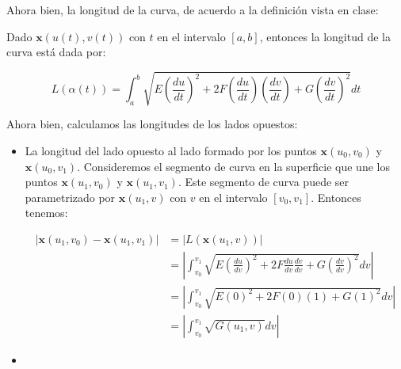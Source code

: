 \begin{problema}
\begin{enumerate}
\begin{dem}
\begin{figure}[H]
\end{figure}

Ahora bien, la longitud de la curva, de acuerdo a la definición vista en clase: 

\begin{cajita}
    Dado $\mathbf{x}(u(t),v(t))$ con $t$ en el intervalo $[a,b]$, entonces la longitud de la curva está dada por:

$$ L(\alpha(t)) = \int_a^b \sqrt{E\left(\frac{du}{dt}\right)^2 + 2F\left(\frac{du}{dt}\right)\left(\frac{dv}{dt}\right) +G\left(\frac{dv}{dt}\right)^2}dt $$
\end{cajita}

Ahora bien, calculamos las longitudes de los lados opuestos: 
\begin{itemize}
    \item La longitud del lado opuesto al lado formado por los puntos $\mathbf{x}(u_0,v_0)$ y $\mathbf{x}(u_0,v_1)$. Consideremos el segmento de curva en la superficie que une los puntos $\mathbf{x}(u_1,v_0)$ y $\mathbf{x}(u_1,v_1)$. Este segmento de curva puede ser parametrizado por $\mathbf{x}(u_1,v)$ con $v$ en el intervalo $[v_0,v_1]$. Entonces tenemos: 
    

    \begin{align*} |\mathbf{x}(u_1,v_0) - \mathbf{x}(u_1,v_1)| &= |L(\mathbf{x}(u_1,v))|\\
        &= \left|\int_{v_0}^{v_1} \sqrt{E\left(\frac{du}{dv}\right)^2 + 2F\frac{du}{dv}\frac{dv}{dv} + G\left(\frac{dv}{dv}\right)^2}dv\right|\\
        &= \left|\int_{v_0}^{v_1} \sqrt{E\left(0\right)^2 + 2F(0)(1) + G\left(1\right)^2}dv\right|\\
        &= \left|\int_{v_0}^{v_1} \sqrt{G(u_1,v)}dv\right|
    \end{align*}
    \item 


\end{itemize}
\end{dem}
\end{enumerate}
\end{problema}
